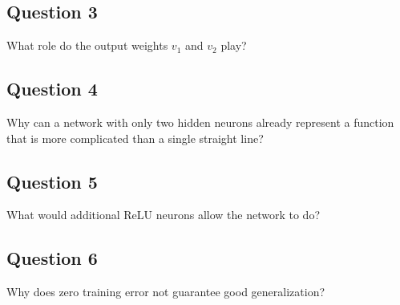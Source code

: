 \documentclass{course_sheet}
\begin{document}
\subsection*{Question 3}
What role do the output weights $v_1$ and $v_2$ play?

\subsection*{Question 4}
Why can a network with only two hidden neurons already represent a function that is more complicated than a single straight line?

\subsection*{Question 5}
What would additional ReLU neurons allow the network to do?

\subsection*{Question 6}
Why does zero training error not guarantee good generalization?
\end{document}
